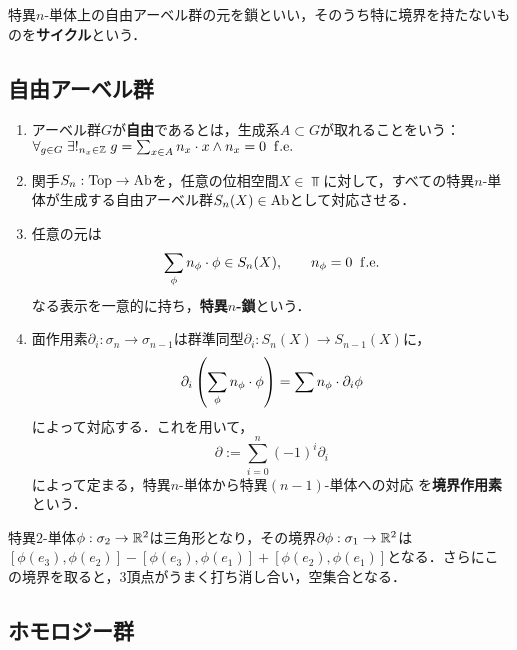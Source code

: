\documentclass[uplatex,dvipdfmx]{jsreport}
\begin{document}
\begin{tcolorbox}[colframe=ForestGreen, colback=ForestGreen!10!white,breakable,colbacktitle=ForestGreen!40!white,coltitle=black,fonttitle=\bfseries\sffamily,
title=]
    特異$n$-単体上の自由アーベル群の元を鎖といい，そのうち特に境界を持たないものを\textbf{サイクル}という．
\end{tcolorbox}

\subsection{自由アーベル群}

\begin{definition}\mbox{}
    \begin{enumerate}
        \item アーベル群$G$が\textbf{自由}であるとは，生成系$A\subset G$が取れることをいう：$\forall_{g\in G}\;\exists!_{n_x\in\mathbb{Z}}\;g=\sum_{x\in A}n_x\cdot x\land n_x=0\;\;\mathrm{f.e.}$
        \item 関手$S_n:\mathrm{Top}\to\mathrm{Ab}$を，任意の位相空間$X\in\Top$に対して，すべての特異$n$-単体が生成する自由アーベル群$S_n(X)\in\mathrm{Ab}$として対応させる．
        \item 任意の元は
        \[\sum_{\phi}n_\phi\cdot\phi\in S_n(X),\qquad n_\phi=0\;\;\mathrm{f.e.}\]
        なる表示を一意的に持ち，\textbf{特異$n$-鎖}という．
        \item 面作用素$\partial_i:\sigma_n\to\sigma_{n-1}$は群準同型$\partial_i:S_n(X)\to S_{n-1}(X)$に，
        \[\partial_i\left(\sum_\phi n_\phi\cdot\phi\right)=\sum n_\phi\cdot\partial_i\phi\]
        によって対応する．これを用いて，
        \[\partial:=\sum^n_{i=0}(-1)^i\partial_i\]
        によって定まる，特異$n$-単体から特異$(n-1)$-単体への対応
        を\textbf{境界作用素}という．
    \end{enumerate}
\end{definition}

\begin{example}[特異$2$-単体]
    特異$2$-単体$\phi:\sigma_2\to\mathbb{R}^2$は三角形となり，その境界$\partial\phi:\sigma_1\to\mathbb{R}^2$は
    $[\phi(e_3),\phi(e_2)]-[\phi(e_3),\phi(e_1)]+[\phi(e_2),\phi(e_1)]$となる．さらにこの境界を取ると，3頂点がうまく打ち消し合い，空集合となる．
\end{example}

\subsection{ホモロジー群}
\end{document}
